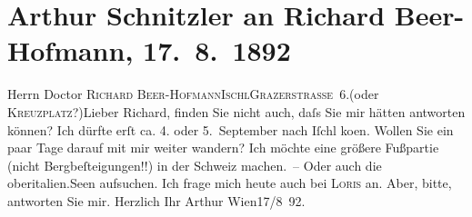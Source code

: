 

         
         \renewcommand{\erwaehntePersonen}{Personen: Richard Beer-Hofmann, Hugo von Hofmannsthal}
         \renewcommand{\erwaehnteOrte}{Orte: Bad Ischl, Grazer Straße, Italien, Kreuzplatz, Schweiz, Wien}
         \renewcommand{\erwaehnteWerke}{}
               \section[Arthur Schnitzler an Richard Beer-Hofmann, 17. 8. 1892]{ Arthur Schnitzler an Richard Beer-Hofmann, 17. 8. 1892}\nopagebreak{}\rehead{ }\begin{ledgroupsized}[t]{13cm}\normalsize\beginnumbering \toendnotes[C]{\smallbreak\pagebreak[2]} 
\pstart{}{\pb}Herrn Doctor \textsc{Richard
                     Beer-Hofmann}\pend{}\pstart{}\textsc{Ischl}\pend{}\pstart{}\textsc{Grazerstraße 6}.\pend{}\pstart{}(oder \textsc{Kreuzplatz}?)\pend{}{\bigskip}\pstart{}{\pb}Lieber Richard,\pend\pstart
           finden Sie nicht auch, daſs Sie mir hätten antworten können? Ich dürfte erſt ca.
                  4. oder 5. September nach Iſchl ko{\geminationm}en. Wollen Sie ein paar Tage darauf mit mir weiter wandern? Ich möchte eine
               größere Fußpartie (nicht Bergbeſteigungen!!) {\pb}in der
                  Schweiz machen. – Oder auch die oberitalien.Seen aufsuchen. Ich frage mich heute auch
               bei \textsc{Loris} an. Aber, bitte, antworten Sie mir.\pend
           \pstart Herzlich Ihr \spacefill\mbox{Arthur}\pend{}\pstart
           Wien17/8 92.\pend
           
         
         \endnumbering{}\end{ledgroupsized}  \newcommand{\dateiname}{L00114}\newcommand{\titel}{Arthur Schnitzler an Richard Beer-Hofmann, 17. 8. 1892}\newcommand{\editorInnen}{Martin Anton Müller und Gerd-Hermann Susen}
      